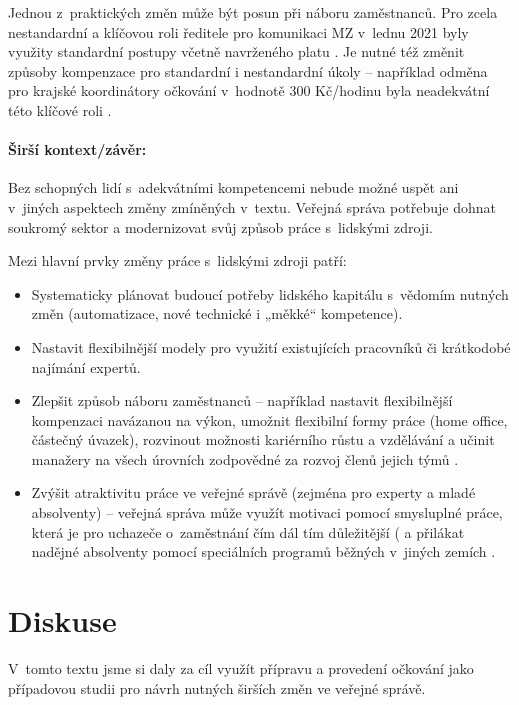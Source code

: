 Jednou z~praktických změn může být posun při náboru zaměstnanců. Pro zcela nestandardní a klíčovou roli ředitele pro komunikaci MZ v~lednu 2021 byly využity standardní postupy včetně navrženého platu \cite{irozhlas_ministerstvo_2021}. Je nutné též změnit způsoby kompenzace pro standardní i nestandardní úkoly -- například odměna pro krajské koordinátory očkování v~hodnotě 300 Kč/hodinu byla neadekvátní této klíčové roli \cite{michal_blaha_pandemie_2021}.

\paragraph{Širší kontext/závěr:} Bez schopných lidí s~adekvátními kompetencemi nebude možné uspět ani v~jiných aspektech změny zmíněných v~textu. Veřejná správa potřebuje dohnat soukromý sektor a modernizovat svůj způsob práce s~lidskými zdroji.

Mezi hlavní prvky změny práce s~lidskými zdroji patří:

\begin{itemize}
  \item Systematicky plánovat budoucí potřeby lidského kapitálu s~vědomím nutných změn (automatizace, nové technické i „měkké“ kompetence).
  \item Nastavit flexibilnější modely pro využití existujících pracovníků či krátkodobé najímání expertů.
  \item Zlepšit způsob náboru zaměstnanců -- například nastavit flexibilnější kompenzaci navázanou na výkon, umožnit flexibilní formy práce (home office, částečný úvazek), rozvinout možnosti kariérního růstu a vzdělávání a učinit manažery na všech úrovních zodpovědné za rozvoj členů jejich týmů \cite{thomas_finding_2021, mckinsey_desetileti_2021}.
  \item  Zvýšit atraktivitu práce ve veřejné správě (zejména pro experty a mladé absolventy) -- veřejná správa může využít motivaci pomocí smysluplné práce, která je pro uchazeče o~zaměstnání čím dál tím důležitější (\cite{achor_9_2018} a přilákat nadějné absolventy pomocí speciálních programů běžných v~jiných zemích \cite{noauthor_home_2020, mckinsey_desetileti_2021}.
\end{itemize}

\section*{Diskuse}

V~tomto textu jsme si daly za cíl využít přípravu a provedení očkování jako pří\-pa\-do\-vou studii pro návrh nutných širších změn ve veřejné správě.

